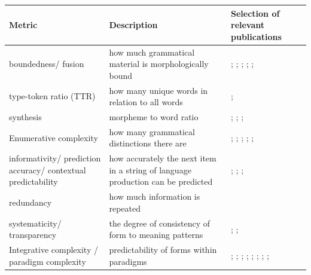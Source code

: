 \documentclass[USenglish]{article}
\providecommand{\DIFdelend}{} %
\DeclareRobustCommand{\DIFdelend}{\DIFOaddend \let\includegraphics\DIFOincludegraphics} %
\begin{document}
\DIFdelend \begin{table}[ht]
    \centering
    \begin{tabular}{p{2.2cm}p{4cm}p{6cm}}  %
        \toprule
        \textbf{Metric} & \textbf{Description}  & \textbf{Selection of relevant publications} \\ 
        \midrule
       boundedness/ fusion   & how much grammatical material is morphologically bound &  \citet{sapir_introduction_1921}; \citet{greenberg_quantitative_1960}; \citet{bybee_morphology_1985}; \cite{skirgard_grambank_2023-1}; \cite{shcherbakova2023societies}; \citet{lupyandale2010} \\ 
         \midrule
        type-token ratio (TTR) & how many unique words in relation to all words  & \cite{kettunen2014can}; \citet{ccoltekin2023complexity}\\ 
               \midrule
 synthesis & morpheme to word ratio  & \citet{sapir_introduction_1921}; \citet{greenberg_quantitative_1960}; \citet{bybee_morphology_1985}; \citet{easterday_syllable_2021} \\
                     \midrule
     Enumerative complexity  & how many grammatical distinctions there are  & \citet{greenberg_quantitative_1960}; \cite{ackerman_morphological_2013}; \cite{shcherbakova2023societies};  \cite{skirgard_grambank_2023-1}; \citet{lupyandale2010}; \citet{ccoltekin2023complexity}\\
\midrule
informativity/ prediction accuracy/ contextual predictability  & how accurately the next item in a string of language production can be predicted & \cite{frank2011insensitivity}; \citet{cohen-priva_phone_2008}; \citet{levshina_frequency_2022}; \citet{cotterell_are_2020} \\    \midrule
redundancy  & how much information is repeated & \cite{leufkens2023measuring}\\    \midrule
systematicity/ transparency  & the degree of consistency of form to meaning patterns & \cite{raviv2019larger}; \cite{hengeveld2018transparent}; \citet{bybee_morphology_1985} \\    \midrule
Integrative complexity / paradigm complexity & predictability of forms within paradigms &  \citet{bybee_morphology_1985}; \cite{round_cognition_2022}; \cite{ackerman_parts_2009}; \citet{ackerman_morphological_2013}; \cite{cotterell2019complexity}; \citet{sagot_comparing_2013}; \citet{moscoso_del_prado_martin_putting_2004}; \citet{beniamine_one_2021}; \citet{bonami_joint_2016}\\    \midrule

\end{tabular}
\end{table}
\end{document}
